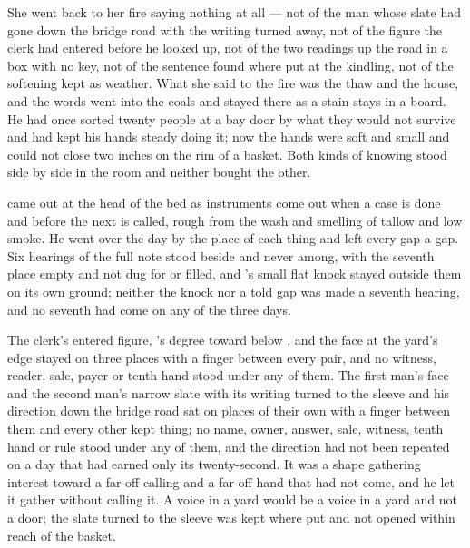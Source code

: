 She went back to her fire saying nothing at all --- not of the man whose slate had gone down the bridge road with the writing turned away, not of the figure the clerk had entered before he looked up, not of the two readings up the road in a box with no key, not of the sentence found where put at the kindling, not of the softening kept as weather. What she said to the fire was the thaw and the house, and the words went into the coals and stayed there as a stain stays in a board. He had once sorted twenty people at a bay door by what they would not survive and had kept his hands steady doing it; now the hands were soft and small and could not close two inches on the rim of a basket. Both kinds of knowing stood side by side in the room and neither bought the other.

\scenebreak

 came out at the head of the bed as instruments come out when a case is done and before the next is called, rough from the wash and smelling of tallow and low smoke. He went over the day by the place of each thing and left every gap a gap. Six hearings of the full note stood beside and never among, with the seventh place empty and not dug for or filled, and 's small flat knock stayed outside them on its own ground; neither the knock nor a told gap was made a seventh hearing, and no seventh had come on any of the three days.

The clerk's entered figure, 's degree toward  below , and the face at the yard's edge stayed on three places with a finger between every pair, and no witness, reader, sale, payer or tenth hand stood under any of them. The first man's face and the second man's narrow slate with its writing turned to the sleeve and his direction down the bridge road sat on places of their own with a finger between them and every other kept thing; no name, owner, answer, sale, witness, tenth hand or rule stood under any of them, and the direction had not been repeated on a day that had earned only its twenty-second. It was a shape gathering interest toward a far-off calling and a far-off hand that had not come, and he let it gather without calling it. A voice in a yard would be a voice in a yard and not a door; the slate turned to the sleeve was kept where put and not opened within reach of the basket.

